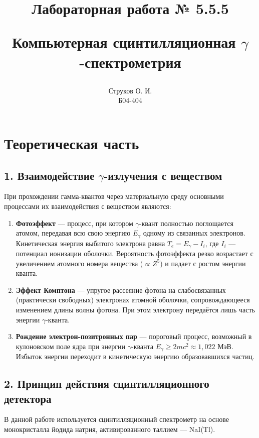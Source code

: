 \documentclass[12pt,a4paper]{article}
\begin{document}
\title{\begin{center}Лабораторная работа № 5.5.5\end{center}
Компьютерная сцинтилляционная $\gamma$-спектрометрия}
\author{Струков О. И. \\ Б04-404}
\date{}

\thispagestyle{empty}
\maketitle
\newpage
{}

\section*{Теоретическая часть}

\subsection*{1. Взаимодействие $\gamma$-излучения с веществом}
При прохождении гамма-квантов через материальную среду основными процессами их взаимодействия с веществом являются:
\begin{enumerate}
    \item \textbf{Фотоэффект} --- процесс, при котором $\gamma$-квант полностью поглощается атомом, передавая всю свою энергию $E_\gamma$ одному из связанных электронов. Кинетическая энергия выбитого электрона равна $T_e = E_\gamma - I_i$, где $I_i$ --- потенциал ионизации оболочки. Вероятность фотоэффекта резко возрастает с увеличением атомного номера вещества ($\propto Z^5$) и падает с ростом энергии кванта.
    \item \textbf{Эффект Комптона} --- упругое рассеяние фотона на слабосвязанных (практически свободных) электронах атомной оболочки, сопровождающееся изменением длины волны фотона. При этом электрону передаётся лишь часть энергии $\gamma$-кванта.
    \item \textbf{Рождение электрон-позитронных пар} --- пороговый процесс, возможный в кулоновском поле ядра при энергии $\gamma$-кванта $E_\gamma \geqslant 2mc^2 \approx 1,022$ МэВ. Избыток энергии переходит в кинетическую энергию образовавшихся частиц.
\end{enumerate}

\subsection*{2. Принцип действия сцинтилляционного детектора}
В данной работе используется сцинтилляционный спектрометр на основе монокристалла йодида натрия, активированного таллием --- NaI(Tl). 
\end{document}
